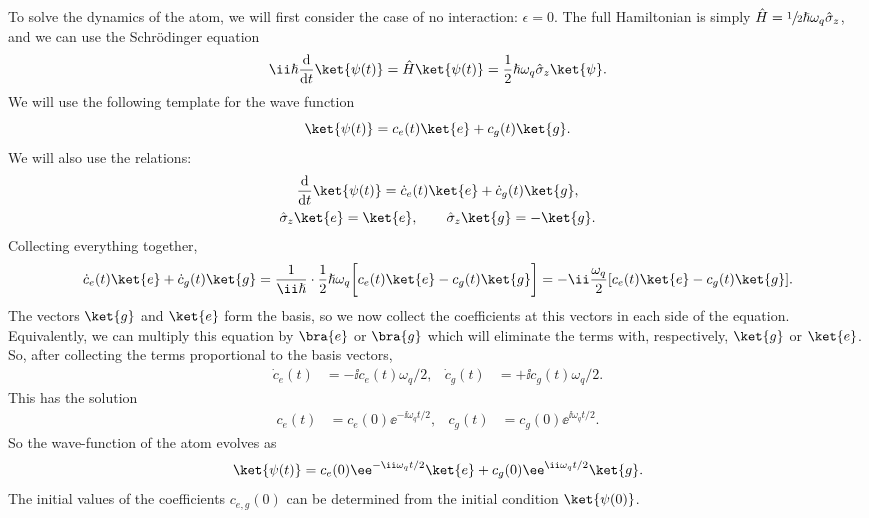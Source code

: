 \documentclass[fontsize=9pt,bookmarkpackage=false]{scrartcl}
\renewcommand{\hbar}{\hslash}
\begin{document}
To solve the dynamics of the atom, we will first consider the case of no interaction: $\epsilon = 0$.
The full Hamiltonian is simply $\hat H = \sfrac 12 \hbar \omega_q \hat \sigma_z$, and we can use the Schrödinger equation
\begin{equation}
  \ii \hbar \diff{}{t } \ket{ \psi (t) } = \hat H \ket{ \psi (t) }
  =
  \frac 12 \hbar \omega_q \hat \sigma_z \ket{ \psi }.
\end{equation}
We will use the following template for the wave function
\begin{equation}
  \ket{ \psi (t) } = c_e (t) \ket{ e } + c_g (t) \ket{ g }.
\end{equation}
We will also use the relations:
\begin{gather}
  \diff{}{t } \ket{ \psi (t) }
  = \dot c_e (t) \ket{ e }
  + \dot c_g (t) \ket{ g },
  \\
  \hat \sigma_z \ket{ e } = \ket{ e },
  \qquad
  \hat \sigma_z \ket{ g } = - \ket{ g }.
\end{gather}
Collecting everything together,
\begin{equation}
  \dot c_e (t) \ket{ e } + \dot c_g (t) \ket {g }
  =
  \frac{ 1 }{ \ii \hbar } \cdot \frac 12 \hbar \omega_q
  \bigg[ c_e (t)\ket{ e } - c_g (t)\ket{ g } \bigg]
  =
  - \ii \frac{ \omega_q }{ 2 } [ c_e (t) \ket{ e } - c_g (t ) \ket { g } ].
\end{equation}
The vectors $\ket{g}$ and $\ket{e}$ form the basis, so we now collect the coefficients at this vectors in each side of the equation.
Equivalently, we can multiply this equation by $\bra{e}$ or $\bra{g}$ which will eliminate the terms with, respectively, $\ket{g}$ or $\ket{e}$.
So, after collecting the terms proportional to the basis vectors,
\begin{align}
  \dot c_e (t) & = - \ii c_e(t) \omega_q / 2 ,
  &
  \dot c_g (t) & = + \ii c_g(t) \omega_q / 2 .
\end{align}
This has the solution
\begin{align}
  c_e (t) & = c_e (0) \ee^{ - \ii \omega_q t / 2 },
  &
  c_g (t) & = c_g (0) \ee^{ \ii \omega_q t / 2 }.
\end{align}
So the wave-function of the atom evolves as
\begin{equation}
  \label{eq:qubit:nocoupling}
  \ket{ \psi (t) }
  =
  c_e (0) \ee^{ - \ii \omega_q t / 2 } \ket{ e }
  +
  c_g (0) \ee^{ \ii \omega_q t / 2 } \ket{ g }.
\end{equation}
The initial values of the coefficients $c_{e,g }(0)$ can be determined from the initial condition $\ket{ \psi (0)}$.
\end{document}
